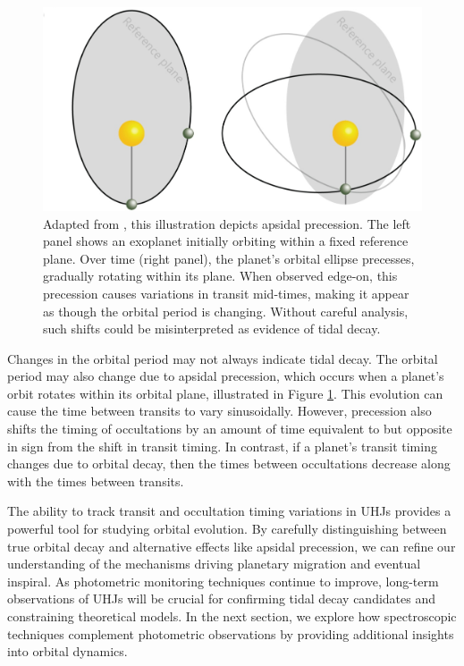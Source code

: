 \documentclass[oneside,12pt]{amsart}
\numberwithin{page}{section}
\begin{document}
\begin{figure}[htbp]
    \centering
    \includegraphics[width=0.8\linewidth]{figs/precession.jpg}
    \caption{Adapted from \citet{vervoort2022system}, this illustration depicts apsidal precession. The left panel shows an exoplanet initially orbiting within a fixed reference plane. Over time (right panel), the planet’s orbital ellipse precesses, gradually rotating within its plane. When observed edge-on, this precession causes variations in transit mid-times, making it appear as though the orbital period is changing. Without careful analysis, such shifts could be misinterpreted as evidence of tidal decay.}
    \label{fig:precession}
\end{figure}

Changes in the orbital period may not always indicate tidal decay. The orbital period may also change due to apsidal precession, which occurs when a planet's orbit rotates within its orbital plane, illustrated in Figure \ref{fig:precession}. This evolution can cause the time between transits to vary sinusoidally. However, precession also shifts the timing of occultations by an amount of time equivalent to but opposite in sign from the shift in transit timing. In contrast, if a planet's transit timing changes due to orbital decay, then the times between occultations decrease along with the times between transits.

The ability to track transit and occultation timing variations in UHJs provides a powerful tool for studying orbital evolution. By carefully distinguishing between true orbital decay and alternative effects like apsidal precession, we can refine our understanding of the mechanisms driving planetary migration and eventual inspiral. As photometric monitoring techniques continue to improve, long-term observations of UHJs will be crucial for confirming tidal decay candidates and constraining theoretical models. In the next section, we explore how spectroscopic techniques complement photometric observations by providing additional insights into orbital dynamics.
\end{document}
